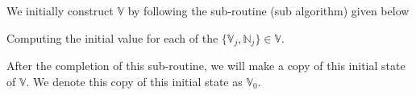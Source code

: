 \documentclass[../../ClusteringConnectionsMAIN.tex]{subfiles}
\begin{document}
\begin{flushleft}
\begin{large}


We initially construct $\mathbb{V}$ by following the sub-routine (sub algorithm) given below

\begin{algorithm}
\caption{Computing the initial value for each of the $\bigl\{ \mathbb{V}_j, \mathbb{N}_j \bigr\} \in \mathbb{V}$.}
\end{algorithm}

After the completion of this sub-routine, we will make a copy of this initial state of $\mathbb{V}$.  We denote this copy of this initial state as $\mathbb{V}_0$.








































\end{large}
\end{flushleft}
\end{document}
